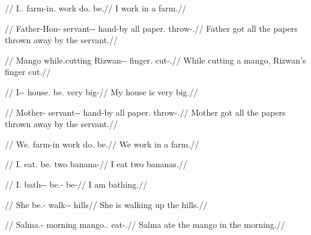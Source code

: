 \documentclass{article}
\begin{document}
\ex
\begingl
\gla{} \textipa{\t*{ts}\super he\|[t\|[ta-n@} 
 //
\glb I.\M.\Nom{} farm-in.\Loc{} work do.\Ipfv{} be.\Prs//
\glft I work in a farm.//
\endgl
\xe

\ex
\begingl
\gla{}  
  //
\glb Father-Hon-\Erg{} servant-\Gen{}-\Pl{} hand-by all paper.\Pl{}
throw-\Pfv{}.\Pl//
\glft Father got all the papers thrown away by the servant.//
\endgl
\xe

\ex
\begingl
\gla{}   
//
\glb Mango while.cutting Rizwan-\Gen{}-\Pl{} finger.\F{} cut-\Pfv{}.\F//
\glft While cutting a mango, Rizwan's finger cut.//
\endgl
\xe

\ex
\begingl
\gla{}   
//
\glb I-\Gen{}-\M{} house.\M{} be.\Prs{} very big-\M//
\glft My house is very big.//
\endgl
\xe

\ex
\begingl
\gla{}   
 //
\glb Mother-\Erg{} servant-\Gen{}-\Pl{} hand-by all paper.\Pl{}
throw-\Pfv{}.\Pl//
\glft Mother got all the papers thrown away by the servant.//
\endgl
\xe

\ex
\begingl
\gla{} \textipa{\t*{ts}\super he\|[t\|[ta-n@} 
 //
\glb We.\Nom{} farm-in work do.\Ipfv{} be.\Prs//
\glft We work in a farm.//
\endgl
\xe

\ex
\begingl
\gla{}   \textipa{\|[dui}
//
\glb I.\Sg{} eat.\Ipfv{} be.\Prs{} two banana-\Pl//
\glft I eat two bananas.// 
\endgl
\xe

\ex
\begingl
\gla{} \textipa{n\super hai-\|[d-i}  //
\glb I.\F{} bath-\Prs{}-\F{} be.\Prog{}-\F{} be-\Prs//
\glft I am bathing.//
\endgl
\xe

\ex
\begingl
\gla{}  \textipa{\t*{ts}Ol-\|[d-i}
//
\glb She be.\Prog{}-\F{} walk-\Prog{}-\F{} hills//
\glft She is walking up the hills.//
\endgl
\xe

\ex
\begingl
\gla{} \textipa{\|[do\|[t\|[ti}  //
\glb Salma.\F{}-\Erg{} morning mango.\Abs{}.\M{} eat-\Pfv{}.\M//
\glft Salma ate the mango in the morning.//
\endgl
\xe
\end{document}
